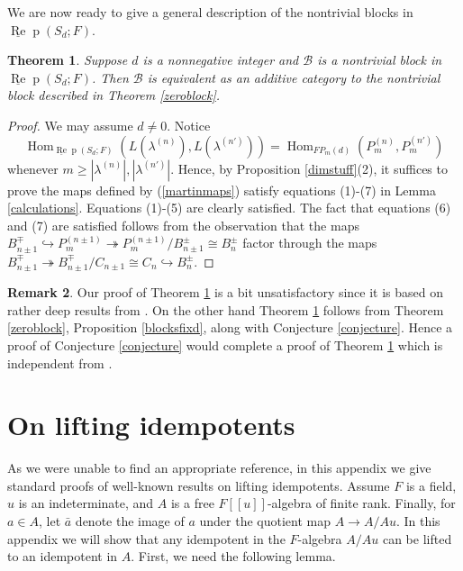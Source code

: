\documentclass{amsart}
\newtheorem{theorem}{Theorem}[section]
\theoremstyle{definition}
\newtheorem{remark}[theorem]{Remark}
\newcommand{\Hom}{\operatorname{Hom}}
\def\uRep{\underline{\operatorname{Re}}\!\operatorname{p}}
\renewcommand{\1}{_{(1)}}
\renewcommand{\2}{_{(2)}}
\newcommand{\3}{_{(3)}}
\newcommand{\4}{_{(4)}}
\newcommand{\cat}{\mathcal}
\begin{document}
We are now ready to give a general description of the nontrivial blocks in $\uRep(S_d; F)$. 

\begin{theorem}\label{blocksviamartin}  Suppose $d$ is a nonnegative integer and $\cat{B}$ is a nontrivial block in $\uRep(S_d; F)$.  Then $\cat{B}$ is equivalent as an additive category to the nontrivial block described in Theorem \ref{zeroblock}.
\end{theorem}

\begin{proof}  We may assume $d\not=0$.  Notice $$\Hom_{\uRep(S_d; F)}(L(\lambda^{(n)}), L(\lambda^{(n')}))=\Hom_{FP_m(d)}(P_m^{(n)}, P_m^{(n')})$$ whenever $m\geq |\lambda^{(n)}|, |\lambda^{(n')}|$.  Hence, by Proposition \ref{dimstuff}(2), it suffices to prove the maps defined by (\ref{martinmaps}) satisfy  equations (1)-(7) in Lemma \ref{calculations}.  Equations (1)-(5) are clearly satisfied. The fact that equations (6) and (7) are satisfied follows from the observation that  the maps $B^\mp_{n\pm1}\hookrightarrow P_m^{(n\pm1)}\twoheadrightarrow P_m^{(n\pm1)}/B^\pm_{n\pm1}\cong B^\pm_n$ factor through the maps $B^\mp_{n\pm1}\twoheadrightarrow B^\mp_{n\pm1}/C_{n\pm1}\cong C_n\hookrightarrow B^\pm_n$.  
\end{proof}

\begin{remark} Our proof of Theorem \ref{blocksviamartin} is a bit unsatisfactory since it is
based on rather deep results from \cite{MR1399030}. On the other hand Theorem \ref{blocksviamartin} follows from Theorem \ref{zeroblock}, Proposition \ref{blocksfixd}, along with Conjecture \ref{conjecture}.  Hence a proof of Conjecture \ref{conjecture} would complete a proof of Theorem \ref{blocksviamartin} which is independent from \cite{MR1399030}. 
\end{remark}



\appendix

\section{On lifting idempotents}\label{liftingappendix}    As we were unable to find an appropriate reference, in this appendix we give standard proofs of well-known results on lifting idempotents.
Assume $F$ is a field, $u$ is an indeterminate, and $A$ is a free $F[[u]]$-algebra of finite rank.  Finally, for $a\in A$, let $\bar{a}$ denote the image of $a$ under the quotient map $A\to A/Au$.  In this appendix we will show that any idempotent in the $F$-algebra $A/Au$ can be lifted to an idempotent in $A$.  First, we need the following lemma.
\end{document}
